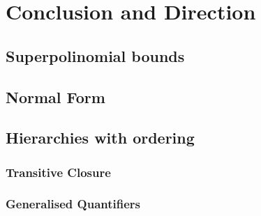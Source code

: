 \chapter{Conclusion and Direction}\label{ch:conclusion-and-direction}

\section{Superpolinomial bounds}

\section{Normal Form}

\section{Hierarchies with ordering}

\subsection{Transitive Closure}\label{subsec:transitive-closure}

\subsection{Generalised Quantifiers}\label{subsec:generalised-quantifiers}